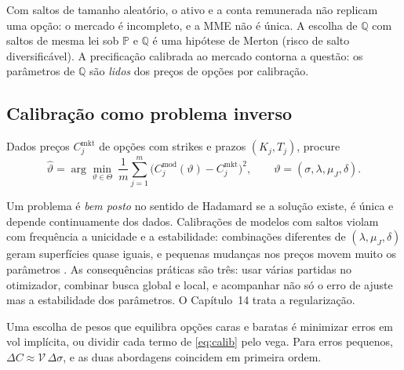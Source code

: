 \begin{observacao}
Com saltos de tamanho aleatório, o ativo e a conta remunerada não replicam uma opção: o mercado é incompleto, e a MME não é única. A escolha de $\mathbb Q$ com saltos de mesma lei sob $\mathbb P$ e $\mathbb Q$ é uma hipótese de Merton (risco de salto diversificável). A precificação calibrada ao mercado contorna a questão: os parâmetros de $\mathbb Q$ são \emph{lidos} dos preços de opções por calibração.
\end{observacao}

\subsection{Calibração como problema inverso}

\begin{definicao}
Dados preços $C^{\mathrm{mkt}}_j$ de opções com strikes e prazos $(K_j,T_j)$, procure
\begin{equation}\label{eq:calib}
\hat\vartheta=\arg\min_{\vartheta\in\Theta}\ \frac1m\sum_{j=1}^m\big(C^{\mathrm{mod}}_j(\vartheta)-C^{\mathrm{mkt}}_j\big)^2,\qquad \vartheta=(\sigma,\lambda,\mu_J,\delta).
\end{equation}
\end{definicao}

\begin{observacao}
Um problema é \emph{bem posto} no sentido de Hadamard se a solução existe, é única e depende continuamente dos dados. Calibrações de modelos com saltos violam com frequência a unicidade e a estabilidade: combinações diferentes de $(\lambda,\mu_J,\delta)$ geram superfícies quase iguais, e pequenas mudanças nos preços movem muito os parâmetros \citep{conttankov2004}. As consequências práticas são três: usar várias partidas no otimizador, combinar busca global e local, e acompanhar não só o erro de ajuste mas a estabilidade dos parâmetros. O Capítulo~14 trata a regularização.
\end{observacao}

Uma escolha de pesos que equilibra opções caras e baratas é minimizar erros em vol implícita, ou dividir cada termo de \eqref{eq:calib} pelo vega. Para erros pequenos, $\Delta C\approx\mathcal V\,\Delta\sigma$, e as duas abordagens coincidem em primeira ordem.
